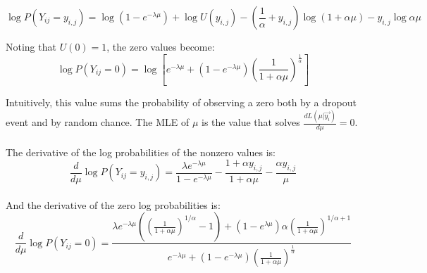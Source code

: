 \documentclass[11pt]{article}
\begin{document}
$$
\log P(Y_{ij} = y_{i,j}) = \log{(1 - e^{-\lambda\mu})} + \log {U(y_{i,j})} - \left( \frac{1}{\alpha} +y_{i,j} \right) \log {(1+\alpha \mu)} - y_{i,j} \log {\alpha \mu}
$$

Noting that $U(0) = 1$, the zero values become:
$$
\log P(Y_{ij} = 0) = \log \left[ e^{-\lambda \mu} + (1 - e^{-\lambda \mu}) \left(\frac{1}{1+\alpha\mu}\right)^{\frac{1}{\alpha}} \right]
$$

Intuitively, this value sums the probability of observing a zero both by a dropout event and by random chance. The MLE of $\mu$ is the value that solves $\frac{d L(\mu | \vec{y_i})}{d \mu} = 0$.\\ 
\\
The derivative of the log probabilities of the nonzero values is:
$$
\frac{d}{d \mu} \log P(Y_{ij} = y_{i,j}) = \frac{\lambda e^{-\lambda \mu}}{1 - e^{-\lambda \mu}} - \frac{1 + \alpha y_{i,j}}{1 + \alpha \mu} - \frac{\alpha y_{i,j}}{\mu}
$$
\\
And the derivative of the zero log probabilities is:
$$
\frac{d}{d \mu} \log P(Y_{ij} = 0) = \frac{\lambda e^{-\lambda \mu}\left( \left( \frac{1}{1+\alpha \mu}\right)^{1/\alpha} -1 \right) + (1 - e^{\lambda \mu}) \alpha \left( \frac{1}{1+\alpha\mu} \right)^{1/\alpha + 1}}{e^{-\lambda \mu} + (1 - e^{-\lambda \mu}) \left(\frac{1}{1+\alpha\mu}\right)^{\frac{1}{\alpha}}}
$$
\end{document}
